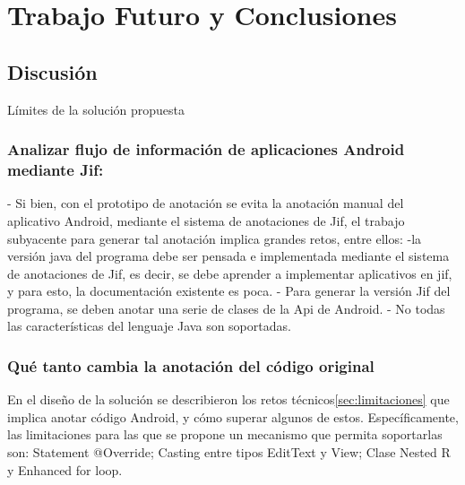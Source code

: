 \label{ch:trabajoFuturo}
\chapter{Trabajo Futuro y Conclusiones}
\section{Discusión}
Límites de la solución propuesta\newline

\subsection{Analizar flujo de información de aplicaciones Android mediante Jif:}
- Si bien, con el prototipo de anotación se evita la anotación manual del
aplicativo Android, mediante el sistema de anotaciones de Jif, el trabajo
subyacente para generar tal anotación implica grandes retos, entre ellos:\newline
-la versión java del programa debe ser pensada e implementada mediante el
sistema de anotaciones de Jif, es decir, se debe aprender a implementar
aplicativos en jif, y para esto, la documentación existente es poca.\newline
- Para generar la versión Jif del programa, se deben anotar una serie de clases
de la Api de Android.\newline
- No todas las características del lenguaje Java son soportadas.

\subsection{Qué tanto cambia la anotación del código original}
En el diseño de la solución se describieron los retos
técnicos\ref{sec:limitaciones} que implica anotar código Android, y cómo superar
algunos de estos. Específicamente, las limitaciones para las que se propone un
mecanismo que permita soportarlas son: Statement @Override; Casting entre tipos
EditText y View; Clase Nested R y Enhanced for loop.

